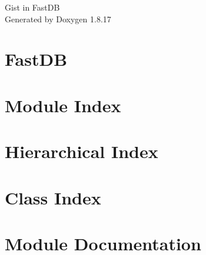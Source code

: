 \let\mypdfximage\pdfximage\def\pdfximage{\immediate\mypdfximage}\documentclass[twoside]{book}
\newcommand{\+}{\discretionary{\mbox{\scriptsize$\hookleftarrow$}}{}{}}
\newcommand{\clearemptydoublepage}{%
  \newpage{\pagestyle{empty}\cleardoublepage}%
}
\begin{document}
\hypersetup{pageanchor=false,
             bookmarksnumbered=true,
             pdfencoding=unicode
            }
\begin{titlepage}
\vspace*{7cm}
\begin{center}%
{\Large Gist in Fast\+DB }\\
\vspace*{1cm}
{\large Generated by Doxygen 1.8.17}\\
\end{center}
\end{titlepage}
\clearemptydoublepage
{}
\tableofcontents
\clearemptydoublepage
{}
\hypersetup{pageanchor=true}

\chapter{Fast\+DB}
\label{md__home_aliakbaraledaghi_Programming_GiST_GistInFastDB_README}

\chapter{Module Index}

\chapter{Hierarchical Index}

\chapter{Class Index}

\chapter{Module Documentation}

\end{document}
